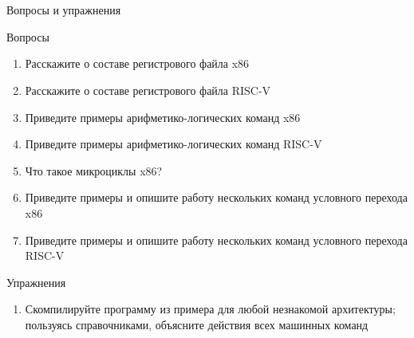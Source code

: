 \documentclass[xetex,aspectratio=43]{beamer}
\begin{document}
\section*{}

\begin{frame}{Вопросы и упражнения}
    \begin{block}{Вопросы}
        \begin{enumerate}
            \tightlist
            \item
            Расскажите о составе регистрового файла x86
            \item
            Расскажите о составе регистрового файла RISC-V
            \item
            Приведите примеры арифметико-логических команд x86
            \item
            Приведите примеры арифметико-логических команд RISC-V
            \item
            Что такое микроциклы x86?
            \item
            Приведите примеры и опишите работу нескольких команд условного
            перехода x86
            \item
            Приведите примеры и опишите работу нескольких команд условного
            перехода RISC-V
        \end{enumerate}
    \end{block}

    \begin{block}{Упражнения}
        \begin{enumerate}
            \tightlist
            \item
            Скомпилируйте программу из примера для любой незнакомой архитектуры;
            пользуясь справочниками, объясните действия всех машинных команд
        \end{enumerate}
    \end{block}
\end{frame}

\postamble
\end{document}
